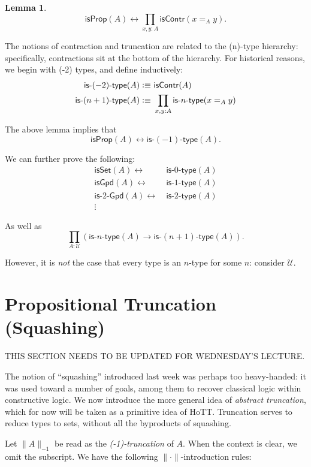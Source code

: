 \documentclass[11pt]{article}
\newcommand*{\isSet}{\mathsf{isSet}}
\newcommand*{\isProp}{\mathsf{isProp}}
\newcommand*{\isContr}{\mathsf{isContr}}
\newcommand*{\isNtype}[1]{\mathsf{is}\mbox{-}#1\mbox{-}\mathsf{type}}
\newtheorem{lemma}{Lemma}
\begin{document}
\begin{lemma}
 $$\isProp(A)\leftrightarrow \prod_{x,y:A}\isContr(x=_A y).$$
\end{lemma}

The notions of contraction and truncation are related to the (n)-type hierarchy: 
specifically, contractions sit at the bottom of the hierarchy. For historical reasons,
we begin with (-2) types, and define inductively:
\begin{align*}
 \isNtype{(-2)}(A)\defeq&\ \isContr(A) \\ %
 \isNtype{(n+1)}(A)\defeq &\ \prod_{x,y:A}\isNtype{n}(x=_A y)
\end{align*}

The above lemma implies that
$$\isProp(A)\leftrightarrow \isNtype{(-1)}(A).$$

We can further prove the following:
\begin{align*}
 \isSet(A)\leftrightarrow &\ \isNtype{0}(A) \\
 \mathsf{isGpd}(A)\leftrightarrow &\ \isNtype{1}(A) \\
 \mathsf{is}\mbox{-}2\mbox{-}\mathsf{Gpd}(A)\leftrightarrow &\ \isNtype{2}(A) \\
 \vdots\ & 
\end{align*}

As well as
$$\prod_{A:\mathcal{U}}\left( \isNtype{n}(A)\to \isNtype{(n+1)}(A) \right).$$

However, it is \emph{not} the case that every type is an $n$-type for some $n$: consider $\mathcal{U}$.

\section{Propositional Truncation (Squashing)}
THIS SECTION NEEDS TO BE UPDATED FOR WEDNESDAY'S LECTURE.

The notion of ``squashing'' introduced last week was perhaps too heavy-handed: it was used toward
a number of goals, among them to recover classical logic within constructive logic. We now introduce
the more general idea of \emph{abstract truncation}, which for now will be taken as a primitive
idea of HoTT. Truncation serves to reduce types to sets, without all the byproducts of squashing.

Let $\|A\|_{-1}$ be read as the \emph{(-1)-truncation} of $A$. When the context is clear, we omit
the subscript. We have the following $\|\cdot \|$-introduction rules:

\end{document}
